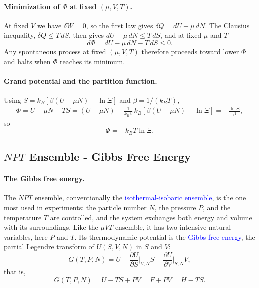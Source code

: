 \paragraph{Minimization of $\Phi$ at fixed $(\mu,V,T)$.}
At fixed $V$ we have $\delta W=0$, so the first law gives
$\delta Q=dU-\mu\,dN$. The Clausius inequality, $\delta Q\leq T\,dS$, then
gives $dU-\mu\,dN\leq T\,dS$, and at fixed $\mu$ and $T$
\begin{equation}
    \boxed{d\Phi=dU-\mu\,dN-T\,dS\leq0.}
\end{equation}
Any spontaneous process at fixed $(\mu,V,T)$ therefore proceeds toward lower
$\Phi$ and halts when $\Phi$ reaches its minimum.

\paragraph{Grand potential and the partition function.}
Using $S=k_B[\beta(U-\mu N)+\ln\Xi]$ and $\beta=1/(k_BT)$,
\begin{align*}
    \Phi=U-\mu N-TS
    =(U-\mu N)-\frac{1}{k_B\beta}\,k_B\left[\beta(U-\mu N)+\ln\Xi\right]
    =-\frac{\ln\Xi}{\beta},
\end{align*}
so
\begin{equation}
    \boxed{\Phi=-k_BT\ln\Xi.}
\end{equation}

\subsection{$NPT$ Ensemble - Gibbs Free Energy}

\paragraph{The Gibbs free energy.}
The $NPT$ ensemble, conventionally the \textcolor{blue}{isothermal-isobaric
ensemble}, is the one most used in experiments: the particle number $N$, the
pressure $P$, and the temperature $T$ are controlled, and the system exchanges
both energy and volume with its surroundings. Like the $\mu VT$ ensemble, it
has two intensive natural variables, here $P$ and $T$. Its thermodynamic
potential is the \textcolor{blue}{Gibbs free energy}, the partial Legendre
transform of $U(S,V,N)$ in $S$ and $V$:
\begin{equation*}
    G(T,P,N)=U-\frac{\partial U}{\partial S}\bigg|_{V,N}S
    -\frac{\partial U}{\partial V}\bigg|_{S,N}V,
\end{equation*}
that is,
\begin{equation}
    \boxed{G(T,P,N)=U-TS+PV=F+PV=H-TS.}
\end{equation}

